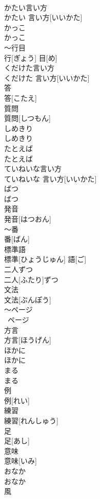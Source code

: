 \documentclass[8pt]{extreport}
\begin{document}
\begin{CJK}{UTF8}{min}
\\	かたい言い方	
\\	かたい 言い方[いいかた]
\\	かっこ	
\\	かっこ
\\	～行目	
\\	行[ぎょう] 目[め]
\\	くだけた言い方	
\\	くだけた 言い方[いいかた]
\\	答	
\\	答[こたえ]
\\	質問	
\\	質問[しつもん]
\\	しめきり	
\\	しめきり
\\	たとえば	
\\	たとえば
\\	ていねいな言い方	
\\	ていねいな 言い方[いいかた]
\\	ばつ	
\\	ばつ
\\	発音	
\\	発音[はつおん]
\\	～番	
\\	番[ばん]
\\	標準語	
\\	標準[ひょうじゅん] 語[ご]
\\	二人ずつ	
\\	二人[ふたり]ずつ
\\	文法	
\\	文法[ぶんぽう]
\\	～ページ	
\\	~ページ
\\	方言	
\\	方言[ほうげん]
\\	ほかに	
\\	ほかに
\\	まる	
\\	まる
\\	例	
\\	例[れい]
\\	練習	
\\	練習[れんしゅう]
\\	足	
\\	足[あし]
\\	意味	
\\	意味[いみ]
\\	おなか	
\\	おなか
\\	風	

\end{CJK}
\end{document}
